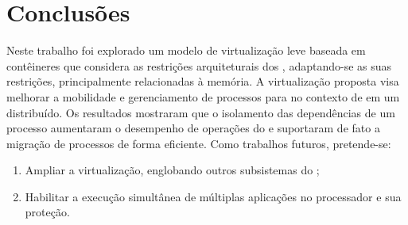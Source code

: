 \glsresetall
\chapter{Conclusões}
\label{chap.conclusions}

Neste trabalho foi explorado um modelo de virtualização leve baseada em contêineres que considera as restrições arquiteturais dos \lws, adaptando-se as suas restrições, principalmente relacionadas à memória. A virtualização proposta visa melhorar a mobilidade e gerenciamento de processos para \lws no contexto de em um \os distribuído.
%
Os resultados mostraram que o isolamento das dependências de um processo aumentaram o desempenho de operações do  e suportaram de fato a migração de processos de forma eficiente. Como trabalhos futuros, pretende-se:

\begin{enumerate}[label=(\roman*)]
    \item Ampliar a virtualização, englobando outros subsistemas do \nanvix;
    \item Habilitar a execução simultânea de múltiplas aplicações no processador e sua proteção.
\end{enumerate}